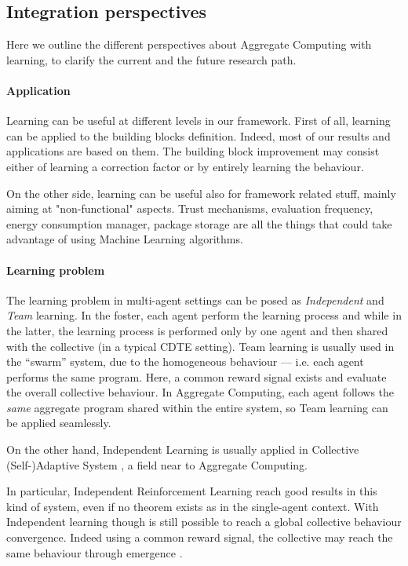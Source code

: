 \documentclass[conference]{IEEEtran}
\begin{document}
\subsection{Integration perspectives}
Here we outline the different perspectives about Aggregate Computing with learning, 
 to clarify the current and the future research path.
%
\paragraph{Application} Learning can be useful at different levels in our framework.
 First of all, learning can be applied to the building blocks definition.
% 
Indeed, most of our results and applications are based on them.
%
The building block improvement may consist either of learning a correction factor or by entirely learning the behaviour.

On the other side, learning can be useful also for framework related stuff,
 mainly aiming at "non-functional" aspects. 
 Trust mechanisms, evaluation frequency, energy consumption manager, package storage are all the things that could take advantage of using Machine Learning algorithms.
 
\paragraph{Learning problem} 
The learning problem in multi-agent settings can be posed as \textit{Independent} and \textit{Team} learning. 
In the foster, each agent perform the learning process and while in the latter,
 the learning process is performed only by one agent and then shared with the collective (in a typical CDTE setting).
% 
Team learning is usually used in the ``swarm'' system, due to the homogeneous behaviour 
 --- i.e. each agent performs the same program. 
 Here, a common reward signal exists and evaluate the overall collective behaviour.
% 
In Aggregate Computing, each agent follows the \textit{same} aggregate program shared within the entire system, so Team learning can 
 be applied seamlessly.

On the other hand, Independent Learning is usually applied in Collective
 (Self-)Adaptive System \cite{csas-and-marl}, a field near to Aggregate Computing.

In particular, Independent Reinforcement Learning reach good results in this kind of system, 
 even if no theorem exists as in the single-agent context.
%
With Independent learning though is still possible to reach a global collective behaviour convergence. 
 Indeed using a common reward signal, the collective may reach the same behaviour through emergence \cite{iima2008swarm, nguyen2018swarm}.
\end{document}

